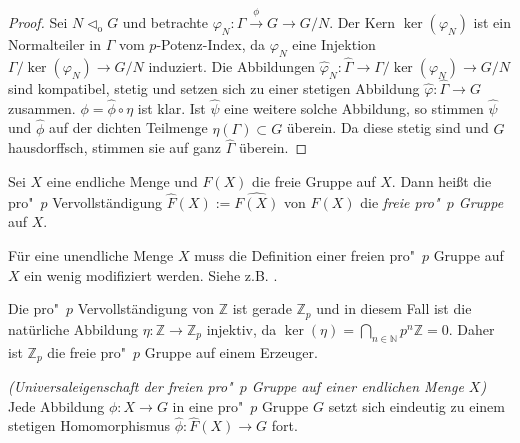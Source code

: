 \documentclass[11pt,a4paper,openany]{memoir}
\begin{document}
\begin{proof}
Sei $N\lhd_\text{o}G$ und betrachte $\varphi_N:\Gamma\stackrel{\phi}{\to} G\to G/N$. Der Kern $\ker(\varphi_N)$ ist ein Normalteiler in $\Gamma$ vom $p$-Potenz-Index, da $\varphi_N$ eine Injektion $\Gamma/\ker(\varphi_N)\to G/N$ induziert. Die Abbildungen $\widehat{\varphi}_N:\widehat{\Gamma}\to\Gamma/\ker(\varphi_N)\to G/N$ sind kompatibel, stetig und setzen sich zu einer stetigen Abbildung $\widehat{\varphi}:\widehat{\Gamma}\to G$ zusammen. $\phi=\widehat{\phi}\circ\eta$ ist klar. Ist $\widehat{\psi}$ eine weitere solche Abbildung, so stimmen $\widehat{\psi}$ und $\widehat{\phi}$ auf der dichten Teilmenge $\eta(\Gamma)\subset G$ überein. Da diese stetig sind und $G$ hausdorffsch, stimmen sie auf ganz $\widehat{\Gamma}$ überein.
\end{proof}

\begin{definition}
Sei $X$ eine endliche Menge und $F(X)$ die freie Gruppe auf $X$. Dann heißt die pro"~$p$ Vervollständigung $\widehat{F}(X) := \widehat{F(X)}$ von $F(X)$ die \textit{freie pro"~$p$ Gruppe} auf $X$.
\end{definition}

\begin{remark}
Für eine unendliche Menge $X$ muss die Definition einer freien pro"~$p$ Gruppe auf $X$ ein wenig modifiziert werden. Siehe z.B. \cite{Wil98}.
\end{remark}

\begin{example}
Die pro"~$p$ Vervollständigung von $\mathbb{Z}$ ist gerade $\mathbb{Z}_p$ und in diesem Fall ist die natürliche Abbildung $\eta:\mathbb{Z}\to\mathbb{Z}_p$ injektiv, da $\ker(\eta)=\bigcap_{n\in\mathbb{N}} p^n\mathbb{Z}=0$. Daher ist $\mathbb{Z}_p$ die freie pro"~$p$ Gruppe auf einem Erzeuger.
\end{example}

\begin{proposition} \textit{(Universaleigenschaft der freien pro"~$p$ Gruppe auf einer endlichen Menge $X$)} 
Jede Abbildung $\phi:X\to G$ in eine pro"~$p$ Gruppe $G$ setzt sich eindeutig zu einem stetigen Homomorphismus $\widehat{\phi} : \widehat{F}(X)\to G$ fort.
\end{proposition}
\end{document}
